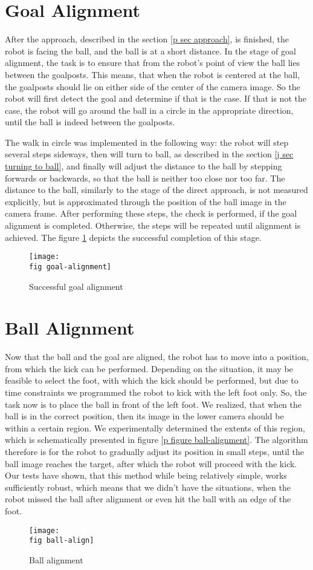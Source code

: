\section{Goal Alignment}
\label{p sec goal align}

After the approach, described in the section \ref{p sec approach}, is finished,
the robot is facing the ball, and the ball is at a short distance. In the stage
of goal alignment, the task is to ensure that from the robot's point of view
the ball lies between the goalposts. This means, that when the robot is
centered at the ball, the goalposts should lie on either side of the center of
the camera image. So the robot will first detect the goal and determine if that
is the case. If that is not the case, the robot will go around the ball in a
circle in the appropriate direction, until the ball is indeed between the
goalposts.

The walk in circle was implemented in the following way: the robot will step
several steps sideways, then will turn to ball, as described in the section
\ref{j sec turning to ball}, and finally will adjust the distance to the ball
by stepping forwards or backwards, so that the ball is neither too close nor
too far. The distance to the ball, similarly to the stage of the direct
approach, is not measured explicitly, but is approximated through the position
of the ball image in the camera frame. After performing these steps, the check
is performed, if the goal alignment is completed. Otherwise, the steps will be
repeated until alignment is achieved. The figure \ref{p figure goal-alignment}
depicts the successful completion of this stage.

\begin{figure}[ht]
  \texttt{[image: \\fig goal-alignment]}
  \caption{Successful goal alignment}
  \label{p figure goal-alignment}
\end{figure}

\section{Ball Alignment}

Now that the ball and the goal are aligned, the robot has to move into a
position, from which the kick can be performed. Depending on the situation, it
may be feasible to select the foot, with which the kick should be performed,
but due to time constraints we programmed the robot to kick with the left foot
only. So, the task now is to place the ball in front of the left foot. We
realized, that when the ball is in the correct position, then its image in the
lower camera should be within a certain region. We experimentally determined
the extents of this region, which is schematically presented in figure \ref{p
  figure ball-alignment}. The algorithm therefore is for the robot to gradually
adjust its position in small steps, until the ball image reaches the target,
after which the robot will proceed with the kick. Our tests have shown, that
this method while being relatively simple, works sufficiently robust, which
means that we didn't have the situations, when the robot missed the ball after
alignment or even hit the ball with an edge of the foot.

\begin{figure}[ht]
  \texttt{[image: \\fig ball-align]}
  \caption{Ball alignment}
  \label{p figure ball-alignment}
\end{figure}
